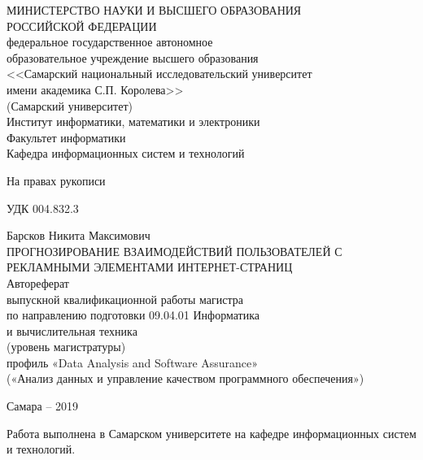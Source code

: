 \documentclass[a4paper, 14pt, oneside]{extarticle}
\begin{document}
    \thispagestyle{empty}
    \begin{center}
    МИНИСТЕРСТВО НАУКИ И ВЫСШЕГО ОБРАЗОВАНИЯ \\
    РОССИЙСКОЙ ФЕДЕРАЦИИ\vspace{14pt} \\
    федеральное государственное автономное \\
    образовательное учреждение высшего образования \\
    <<Самарский национальный исследовательский университет \\
    имени академика С.П. Королева>> \\
    (Самарский университет)\vspace{28pt} \\
    Институт информатики, математики и электроники \\
    Факультет информатики \\
    Кафедра информационных систем и технологий\vspace{28pt} \\
    \begin{flushright}
        На правах рукописи
    \end{flushright}
    \begin{flushleft}
        УДК 004.832.3
    \end{flushleft}
    Барсков Никита Максимович \vspace{14pt} \\
    ПРОГНОЗИРОВАНИЕ ВЗАИМОДЕЙСТВИЙ ПОЛЬЗОВАТЕЛЕЙ С РЕКЛАМНЫМИ ЭЛЕМЕНТАМИ ИНТЕРНЕТ-СТРАНИЦ \vspace{14pt} \\
    \onehalfspacing{}
    Автореферат \\
    выпускной квалификационной работы магистра \\
    по направлению подготовки 09.04.01 Информатика \\
    и вычислительная техника \\
    (уровень магистратуры) \\
    профиль «Data Analysis and Software Assurance» \\
    («Анализ данных и управление качеством программного обеспечения»)\vfill
    \end{center}
    \begin{center}
    Самара -- 2019
    \end{center}

    \newpage
    \noindent Работа выполнена в Самарском университете на кафедре информационных систем и технологий.
    \\
\end{document}
